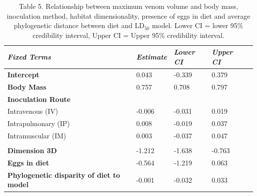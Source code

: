 \begin{table}[H]
  \centering
    \caption[ ]{Table 5. Relationship between maximum venom volume and body mass, inoculation method, habitat dimensionality, presence of eggs in diet and average phylogenetic distance between diet and LD$_{50}$ model. Lower CI = lower 95\% credibility interval, Upper CI = Upper 95\% credibility interval. }
\begin{tabular}{*5l}    \toprule
\emph{Fixed Terms} & \emph{Estimate} & \emph{Lower CI} & \emph{Upper CI}\\\midrule
\textbf{Intercept} & 0.043  &  -0.339 & 0.379 \\ 
\textbf{Body Mass} & 0.757  & 0.708 & 0.797 \\ 
\textbf{Inoculation Route} &  &  &  \\ 
 Intravenous (IV) &  -0.006 &  -0.031 & 0.019 \\
 Intrapulmonary (IP) & 0.008 &  -0.019 & 0.037 \\ 
 Intramuscular (IM) & 0.003 &  -0.037 & 0.047 \\
  &  &  &  \\ 
\textbf{Dimension 3D} &  -1.212 &  -1.638 &  -0.763 \\ 
\textbf{Eggs in diet} &  -0.564 &  -1.219 & 0.063 \\ 
\textbf{Phylogenetic disparity of diet to model} &  -0.001 &  -0.032 & 0.033 \\\bottomrule
 \hline
\end{tabular}
  \label{tbl:Table 5.}
\end{table}



